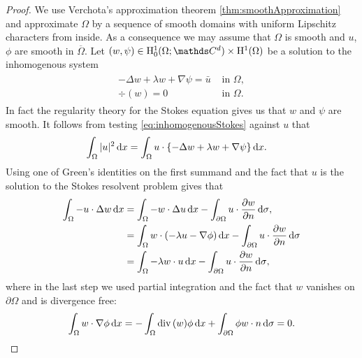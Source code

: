 \begin{proof}
  We use Verchota's approximation theorem \ref{thm:smoothApproximation} and approximate $\Omega$ by a sequence of smooth domains with uniform Lipschitz characters from inside.
  As a consequence we may assume that $\Omega$ is smooth and $u$, $\phi$ are smooth in $\overline\Omega$.
  Let $(w,\psi) \in \HH_0^1(\Omega; \C^d) \times \HH^1(\Omega)$ be a solution to the inhomogenous system
  \begin{align}
    \label{eq:inhomogenousStokes}
    \begin{alignedat}{1}
      - \Delta w + \lambda w + \nabla \psi = \bar u &\text{ in } \Omega, \\
      \div(w) = 0 &\text{ in } \Omega.
    \end{alignedat}
  \end{align}
  In fact the regularity theory for the Stokes equation gives us that $w$ and $\psi$ are smooth.
  It follows from testing \eqref{eq:inhomogenousStokes} against $u$ that
  \begin{align}
    \label{eq:testingInhomogenousStokes}
    \int_\Omega |u|^2 \, {\operatorname{d}\!{x}}
    &= \int_\Omega u \cdot \{ - \Delta w + \lambda w + \nabla \psi \} \, {\operatorname{d}\!{x}}.
  \end{align}
  Using one of Green's identities on the first summand and the fact that $u$ is the solution to the Stokes resolvent problem gives that
  \begin{align*}
    \int_\Omega -u \cdot \Delta w \, {\operatorname{d}\!{x}}
    &= \int_\Omega -w \cdot \Delta u \, {\operatorname{d}\!{x}} - \int_{\partial\Omega} u \cdot \frac{\partial w}{\partial n} \, {\operatorname{d}\!{\sigma}}, \\
    &= \int_\Omega w \cdot ( -\lambda u - \nabla \phi) \, {\operatorname{d}\!{x}} - \int_{\partial\Omega} u \cdot \frac{\partial w}{\partial n} \, {\operatorname{d}\!{\sigma}} \\
    &= \int_\Omega -\lambda w \cdot u \, {\operatorname{d}\!{x}} - \int_{\partial\Omega} u \cdot \frac{\partial w}{\partial n} \, {\operatorname{d}\!{\sigma}}, 
  \end{align*}
  where in the last step we used partial integration and the fact that $w$ vanishes on $\partial\Omega$ and is divergence free:
  \begin{align*}
    \int_\Omega w \cdot \nabla\phi \d x = -\int_\Omega \div(w) \phi \d x + \int_{\partial\Omega} \phi w \cdot n \d\sigma = 0.

\end{align*}
\end{proof}
